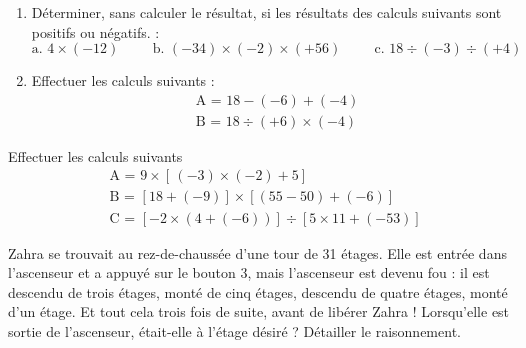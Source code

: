 \documentclass[12pt,a4paper]{article}
\begin{document}
\begin{exercicebox}
    \begin{enumerate}
        \item Déterminer, sans calculer le résultat, si les résultats des 
            calculs suivants sont positifs ou négatifs. : \\
            $$\text{a. } 4\times(-12) \hspace{1cm}\text{b. }
            (-34)\times(-2)\times(+56) \hspace{1cm} \text{c. }
            18\div(-3)\div(+4)$$
        \item Effectuer les calculs suivants :
    \begin{align*}
        &\text{A = }18-(-6)+(-4)\\
        &\text{B = }18\div(+6)\times(-4)
    \end{align*}
    \end{enumerate}
\end{exercicebox}

\begin{exercicebox}
    Effectuer les calculs suivants 
    \begin{align*}
        &\text{A = }9\times[\hspace{2pt}(-3)\times(-2)+5]\\
        &\text{B = }[18+(-9)]\times[(55-50)+(-6)]\\
        &\text{C = }[-2\times(4+(-6))]\div[5\times11+(-53)]
    \end{align*}
\end{exercicebox}

\begin{probbox}
    Zahra se trouvait au rez-de-chaussée d'une tour de 31 étages.
    \newline
    \newline
        Elle est entrée dans l'ascenseur et
        a appuyé sur le bouton 3, mais l'ascenseur est
        devenu fou : il est descendu de trois étages,
        monté de cinq étages, descendu de quatre
        étages, monté d'un étage. Et tout cela trois fois
        de suite, avant de libérer Zahra !
    \newline
    \newline
    Lorsqu'elle est sortie de l'ascenseur, était-elle à l'étage désiré ?
    \newline
    \newline
    Détailler le raisonnement.

\end{probbox}
\end{document}
